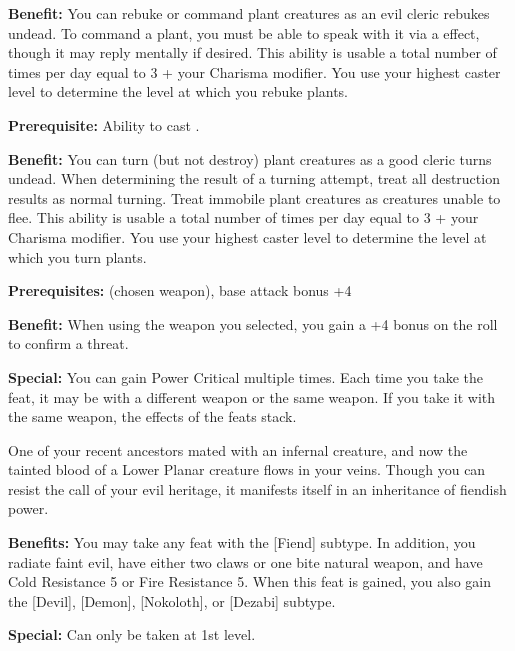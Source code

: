 \textbf{Benefit:} You can rebuke or command plant creatures as an evil cleric rebukes undead. To command a plant, you must be able to speak with it via a  effect, though it may reply mentally if desired. This ability is usable a total number of times per day equal to 3 + your Charisma modifier. You use your highest caster level to determine the level at which you rebuke plants.


\textbf{Prerequisite:} Ability to cast .

\textbf{Benefit:} You can turn (but not destroy) plant creatures as a good cleric turns undead. When determining the result of a turning attempt, treat all destruction results as normal turning. Treat immobile plant creatures as creatures unable to flee. This ability is usable a total number of times per day equal to 3 + your Charisma modifier. You use your highest caster level to determine the level at which you turn plants.


\textbf{Prerequisites:}  (chosen weapon), base attack bonus +4

\textbf{Benefit:} When using the weapon you selected, you gain a +4 bonus on the roll to confirm a threat.

\textbf{Special:} You can gain Power Critical multiple times. Each time you take the feat, it may be with a different weapon or the same weapon.  If you take it with the same weapon, the effects of the feats stack.


One of your recent ancestors mated with an infernal creature, and now the tainted blood of a Lower Planar creature flows in your veins. Though you can resist the call of your evil heritage, it manifests itself in an inheritance of fiendish power.

\textbf{Benefits:} You may take any feat with the [Fiend] subtype. In addition, you radiate faint evil, have either two claws or one bite natural weapon, and have Cold Resistance 5 or Fire Resistance 5. When this feat is gained, you also gain the [Devil], [Demon], [Nokoloth], or [Dezabi] subtype.

\textbf{Special:} Can only be taken at 1st level.


